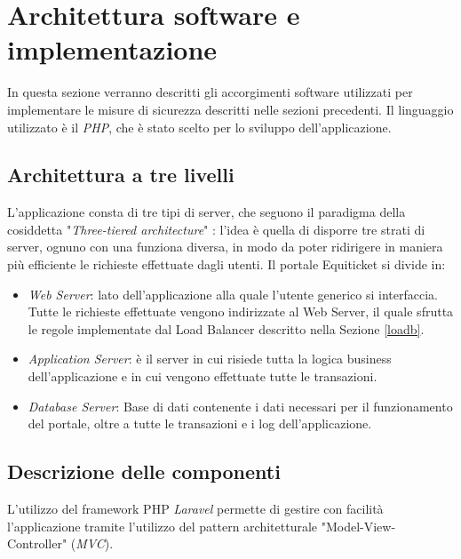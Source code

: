 \section{Architettura software e implementazione} \label{sec:impl}
In questa sezione verranno descritti gli accorgimenti software utilizzati per implementare le misure di sicurezza descritti nelle sezioni precedenti. Il linguaggio utilizzato è il \emph{PHP}, che è stato scelto per lo sviluppo dell'applicazione. 
\subsection{Architettura a tre livelli}
L'applicazione consta di tre tipi di server, che seguono il paradigma della cosiddetta "\emph{Three-tiered architecture}" \cite{menasce2000scaling}: l'idea è quella di disporre tre strati di server, ognuno con una funziona diversa, in modo da poter ridirigere in maniera più efficiente le richieste effettuate dagli utenti. Il portale Equiticket si divide in: 
\begin{itemize}
\item \emph{Web Server}: lato dell'applicazione alla quale l'utente generico si interfaccia. Tutte le richieste effettuate vengono indirizzate al Web Server, il quale sfrutta le regole implementate dal Load Balancer descritto nella Sezione \ref{loadb}. 
\item	\emph{Application Server}: è il server in cui risiede tutta la logica business dell'applicazione e in cui vengono effettuate tutte le transazioni. 
\item \emph{Database Server}: Base di dati contenente i dati necessari per il funzionamento del portale, oltre a tutte le transazioni e i log dell'applicazione. 
\end{itemize}

\subsection{Descrizione delle componenti}
L'utilizzo del framework PHP \emph{Laravel} permette di gestire con facilità l'applicazione tramite l'utilizzo del pattern architetturale "Model-View-Controller" (\emph{MVC}). 
